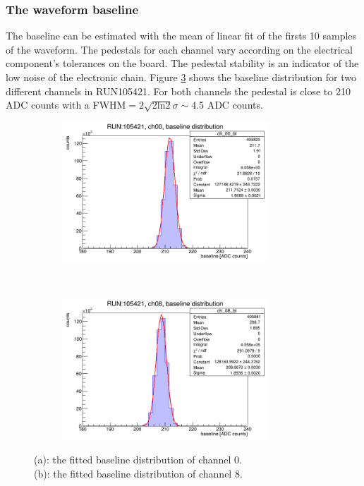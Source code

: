 \subsubsection{The waveform baseline}\label{basel}
The baseline can be estimated with the mean of  linear fit of the firsts 10 samples of the waveform. 
The pedestals for each channel vary according on the electrical component's tolerances on the board.
The pedestal stability is an indicator of the low noise of the electronic chain.
Figure \ref{fig:baseline} shows the baseline distribution for two different channels in RUN105421.
For both channels the pedestal is close to 210 ADC counts with a FWHM$=2 \sqrt{2 \text{ln}2}\sigma\sim$4.5 ADC counts.
\begin{figure}[!h]
  \begin{subfigure}[b]{\textwidth}
      \centering
      \includegraphics[width=0.85\textwidth]{figures/png/baseline_ch00.png}
      \caption{}
      \label{fig:baseline1}
  \end{subfigure}
\\
  \begin{subfigure}[b]{\textwidth}
      \centering
      \includegraphics[width=0.85\textwidth]{figures/png/baseline_ch08.png}
      \caption{}
      \label{fig:baseline2}
  \end{subfigure}
     \caption{(a): the fitted baseline distribution of channel 0. 
     \\
     (b): the fitted baseline distribution of channel 8.}
     \label{fig:baseline}
\end{figure}

